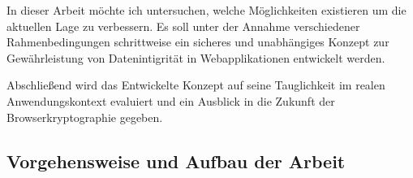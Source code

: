 In dieser Arbeit möchte ich untersuchen, welche Möglichkeiten existieren um die aktuellen Lage zu verbessern. Es soll unter der Annahme verschiedener Rahmenbedingungen schrittweise ein sicheres und unabhängiges Konzept zur Gewährleistung von Datenintigrität in Webapplikationen entwickelt werden.

Abschließend wird das Entwickelte Konzept auf seine Tauglichkeit im realen Anwendungskontext evaluiert und ein Ausblick in die Zukunft der Browserkryptographie gegeben.



\subsection{Vorgehensweise und Aufbau der Arbeit}
\tbd


